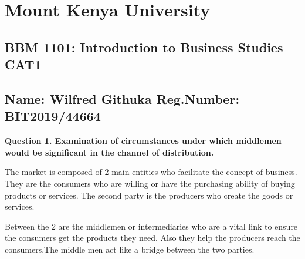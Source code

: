 \documentclass[12pt, a4]{article}
\begin{document}
\section{Mount Kenya University}
\subsection{BBM 1101: Introduction to Business Studies CAT1}
\subsection{Name: Wilfred Githuka Reg.Number: BIT2019/44664}

\textbf{Question 1. Examination of circumstances under which middlemen would be significant in the
channel of distribution.}

The market is composed of 2 main entities who facilitate the concept of
business. They are the consumers who are willing or have the purchasing ability
of buying products or services. The second party is the producers who create the
goods or services.

Between the 2 are the middlemen or intermediaries who are a vital link to ensure
the consumers get the products they need. Also they help the producers reach the
consumers.The middle men act like a bridge between the two parties.
\end{document}
